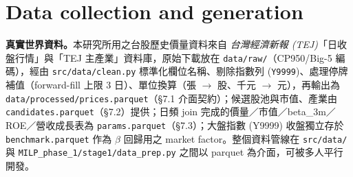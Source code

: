 \documentclass[11pt,a4paper]{article}
\begin{document}
\section{Data collection and generation}
\label{sec-data}

\textbf{真實世界資料。}{}本研究所用之台股歷史價量資料來自 \emph{台灣經濟新報 (TEJ)}「日收盤行情」與「TEJ 主產業」資料庫，原始下載放在 \texttt{data/raw/}（CP950/Big-5 編碼），經由 \texttt{src/data/clean.py} 標準化欄位名稱、剔除指數列 (\texttt{Y9999})、處理停牌補值（forward-fill 上限 3 日）、單位換算（張 $\to$ 股、千元 $\to$ 元），再輸出為 \texttt{data/processed/prices.parquet}（§7.1 介面契約）；候選股池與市值、產業由 \texttt{candidates.parquet}（§7.2）提供；日頻 join 完成的價量／市值／beta\_3m／ROE／營收成長表為 \texttt{params.parquet}（§7.3）；大盤指數 (Y9999) 收盤獨立存於 \texttt{benchmark.parquet} 作為 $\beta$ 回歸用之 market factor。整個資料管線在 \texttt{src/data/} 與 \texttt{MILP\_phase\_1/stage1/data\_prep.py} 之間以 parquet 為介面，可被多人平行開發。
\end{document}
